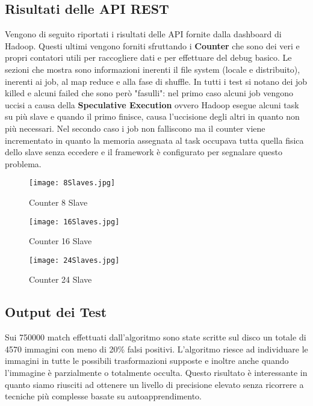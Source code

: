 \subsection{Risultati delle API REST}
Vengono di seguito riportati i risultati delle API fornite dalla dashboard di Hadoop. Questi ultimi vengono forniti sfruttando i \textbf{Counter} che sono dei veri e propri contatori utili per raccogliere dati e per effettuare del debug basico. Le sezioni che mostra sono informazioni inerenti il file system (locale e distribuito), inerenti ai job, al map reduce e alla fase di shuffle. In tutti i test si notano dei job killed e alcuni failed che sono però "fasulli": nel primo caso alcuni job vengono uccisi a causa della \textbf{Speculative Execution} ovvero Hadoop esegue alcuni task su più slave e quando il primo finisce, causa l'uccisione degli altri in quanto non più necessari. Nel secondo caso i job non falliscono ma il counter viene incrementato in quanto la memoria assegnata al task occupava tutta quella fisica dello slave senza eccedere e il framework è configurato per segnalare questo problema.

\begin{figure}[H]
	\texttt{[image: 8Slaves.jpg]}
	\caption{Counter 8 Slave}
	\label{fg:8Slaves.jpg}
\end{figure}

\begin{figure}[H]
	\texttt{[image: 16Slaves.jpg]}
	\caption{Counter 16 Slave}
	\label{fg:16Slaves.jpg}
\end{figure}

\begin{figure}[H]
	\texttt{[image: 24Slaves.jpg]}
	\label{fg:24Slaves.jpg}
	\caption{Counter 24 Slave}
\end{figure}

\subsection{Output dei Test}
Sui 750000 match effettuati dall'algoritmo sono state scritte sul disco un totale di 4570 immagini con meno di 20\% falsi positivi. L'algoritmo riesce ad individuare le immagini in tutte le possibili trasformazioni supposte e inoltre anche quando l'immagine è parzialmente o totalmente occulta. Questo risultato è interessante in quanto siamo riusciti ad ottenere un livello di precisione elevato senza ricorrere a tecniche più complesse basate su autoapprendimento. 

